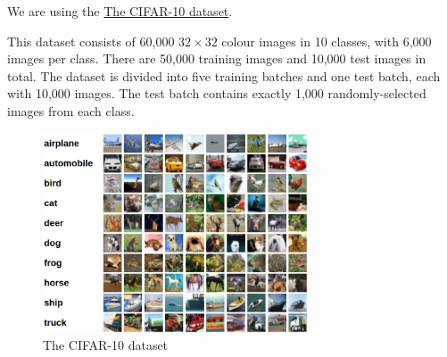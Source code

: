 \documentclass[letter]{article}
\begin{document}
\begin{itemize}
\begin{enumerate}
		\par{We are using the \href{http://www.cs.toronto.edu/~kriz/cifar.html}{The CIFAR-10 dataset}.}
		\par{This dataset consists of 60,000 $ 32\times32 $ colour images in 10 classes, with 6,000 images per class. There are 50,000 training images and 10,000 test images in total. The dataset is divided into five training batches and one test batch, each with 10,000 images. The test batch contains exactly 1,000 randomly-selected images from each class. }
		\begin{figure}[H]
			\centering
			\includegraphics[width=0.7\textwidth]{figs/fig-2.png}
			\caption{The CIFAR-10 dataset}
		\end{figure}
	

\end{enumerate}
\end{itemize}
\end{document}
